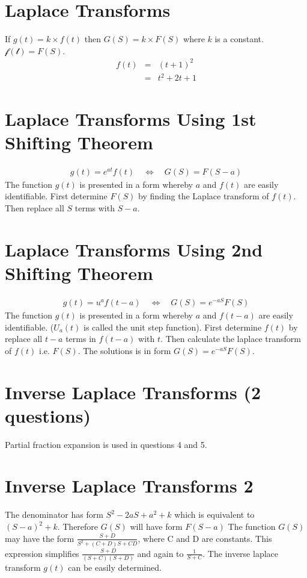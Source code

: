 \documentclass[12pt, a4paper]{article}
\begin{document}
\author{Kevin O'Brien}

\section{Laplace Transforms }
If $g(t)=k \times f(t)$ then $G(S) = k \times F(S)$ where $k$ is a
constant. $\mathcal{f(t)}=F(S)$.
\begin{eqnarray}
f(t) &=& (t+1)^2\\
&=& t^2 +2t +1 \nonumber
\end{eqnarray}


\section{Laplace Transforms Using 1st Shifting Theorem}
\begin{eqnarray}
 g(t) = e^{at}f(t) \quad \Leftrightarrow \quad G(S)= F(S-a) \nonumber
\end{eqnarray}
The function $g(t)$ is presented in a form whereby $a$ and $f(t)$
are easily identifiable. First determine $F(S)$ by finding the
Laplace transform of $f(t)$. Then replace all $S$ terms with
$S-a$.

\section{Laplace Transforms Using 2nd Shifting Theorem}

\begin{eqnarray}
 g(t) = u^{a}f(t-a) \quad \Leftrightarrow \quad G(S)= e^{-aS}F(S) \nonumber
\end{eqnarray}
The function $g(t)$ is presented in a form whereby $a$ and
$f(t-a)$ are easily identifiable. ($U_{a}(t)$ is called the unit
step function). First determine $f(t)$ by replace all $t-a$ terms
in $f(t-a)$ with $t$. Then calculate the laplace transform of
$f(t)$ i.e. $F(S)$. The solutions is in form $G(S)= e^{-aS}F(S)$.

\section{Inverse Laplace Transforms (2 questions) }
Partial fraction expansion is used in questions 4 and 5.
\section{Inverse Laplace Transforms 2}

The denominator has form $S^2 - 2aS + a^2 + k$ which is equivalent
to $(S-a)^2 + k$. Therefore $G(S)$ will have form $F(S-a)$
\newline
The function $G(S)$ may have the form $\frac{S+D}{S^2 +(C+D)S +
CD}$, where C and D are constants. This expression simplifies
$\frac{S+D}{(S+C)(S+D)}$ and again to $\frac{1}{S+C}$. The inverse
laplace transform $g(t)$ can be easily determined.
\end{document}
